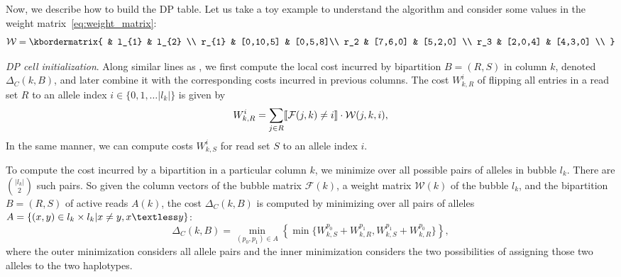 Now, we describe how to build the DP table.
Let us take a toy example to understand the algorithm and consider some values in the weight matrix~\eqref{eq:weight_matrix}:
\begin{equation}\label{eq:weight_matrix1}
  \mathcal{W}  = \kbordermatrix{
     & l_{1}       & l_{2}  \\
    r_{1}       & [0,10,5] &  [0,5,8]\\
    r_2 & [7,6,0] & [5,2,0] \\
    r_3 & [2,0,4] & [4,3,0] \\
  }
\end{equation}

\textit{DP cell initialization}. Along similar lines as \cite{patterson2014whatshap}, we first compute the local cost incurred by bipartition $B= (R,S)$ in column $k$, denoted $\Delta_C(k,B)$, and later combine it with the corresponding costs incurred in previous columns.
The cost $W_{k,R}^i$ of flipping all entries in a read set $R$ to an allele index $i\in\{0,1,\ldots |l_k|\}$ is given by 
\[W_{k,R}^i = \sum_{j\in R}\llbracket \mathcal{F}(j,k)\neq i\rrbracket\cdot\mathcal{W}(j,k,i),\]
In the same manner, we can compute costs $W_{k,S}^i$ for read set $S$ to an allele index $i$.

To compute the cost incurred by a bipartition in a particular column $k$, we minimize over all possible pairs of alleles in bubble $l_k$.
There are ${|l_k| \choose 2}$ such pairs.
So given the column vectors of the bubble matrix $\mathcal{F}(k)$, a weight matrix $\mathcal{W}(k)$ of the bubble $l_k$, and the bipartition $B=(R,S)$ of active reads $A(k)$, the cost $\Delta_C(k,B)$ is computed by minimizing over all pairs of alleles
$A = \{(x,y) \in l_k \times l_k | x \ne y, x\textless y\}$:
\begin{equation}\label{eq:dp-cell}
  \Delta_C(k,B)= \min_{(p_0,p_1)\in {A}}\left\{\min\{W_{k,S}^{p_0} + W_{k,R}^{p_1}, W_{k,S}^{p_1} + W_{k,R}^{p_0}\}\right\},
\end{equation}
where the outer minimization considers all allele pairs and the inner minimization considers the two possibilities of assigning those two alleles to the two haplotypes.

   

%     

